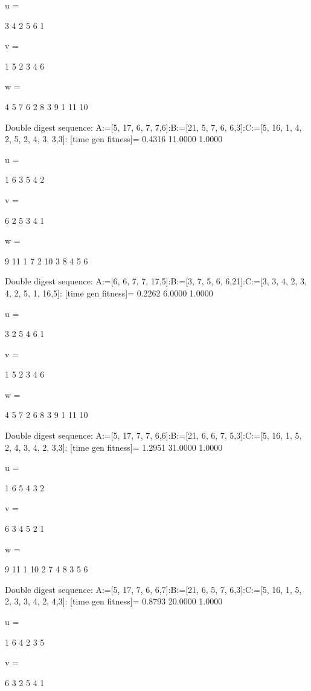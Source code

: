 u =

     3     4     2     5     6     1


v =

     1     5     2     3     4     6


w =

     4     5     7     6     2     8     3     9     1    11    10

Double digest sequence:
A:=[5, 17, 6, 7, 7,6]:B:=[21, 5, 7, 6, 6,3]:C:=[5, 16, 1, 4, 2, 5, 2, 4, 3, 3,3]:
[time gen fitness]=
    0.4316   11.0000    1.0000


u =

     1     6     3     5     4     2


v =

     6     2     5     3     4     1


w =

     9    11     1     7     2    10     3     8     4     5     6

Double digest sequence:
A:=[6, 6, 7, 7, 17,5]:B:=[3, 7, 5, 6, 6,21]:C:=[3, 3, 4, 2, 3, 4, 2, 5, 1, 16,5]:
[time gen fitness]=
    0.2262    6.0000    1.0000


u =

     3     2     5     4     6     1


v =

     1     5     2     3     4     6


w =

     4     5     7     2     6     8     3     9     1    11    10

Double digest sequence:
A:=[5, 17, 7, 7, 6,6]:B:=[21, 6, 6, 7, 5,3]:C:=[5, 16, 1, 5, 2, 4, 3, 4, 2, 3,3]:
[time gen fitness]=
    1.2951   31.0000    1.0000


u =

     1     6     5     4     3     2


v =

     6     3     4     5     2     1


w =

     9    11     1    10     2     7     4     8     3     5     6

Double digest sequence:
A:=[5, 17, 7, 6, 6,7]:B:=[21, 6, 5, 7, 6,3]:C:=[5, 16, 1, 5, 2, 3, 3, 4, 2, 4,3]:
[time gen fitness]=
    0.8793   20.0000    1.0000


u =

     1     6     4     2     3     5


v =

     6     3     2     5     4     1



